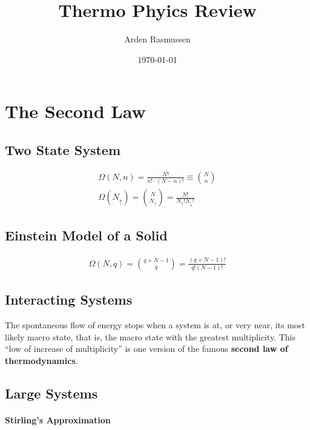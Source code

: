\documentclass[10pt]{article}
\title{Thermo Phyics Review}
\author{Arden Rasmussen}
\date{\today}
\begin{document}
\maketitle
\newpage
\tableofcontents
\newpage
{}

\section{The Second Law}%
\label{sec:the_second_law}

\subsection{Two State System}%
\label{sub:two_state_system}

\begin{align}
  \Omega(N,n) = \frac{N!}{n!\cdot(N-n)!}\equiv{N \choose n}\\
  \Omega\left(N_{\uparrow}\right)={N\choose
  N_{\uparrow}}=\frac{N!}{N_\uparrow!N_\downarrow!}
\end{align}

\subsection{Einstein Model of a Solid}%
\label{sub:einstein_model_of_a_solid}

\begin{align}
  \Omega(N,q)={q+N-1 \choose q} = \frac{(q+N-1)!}{q!(N-1)!}
\end{align}

\subsection{Interacting Systems}%
\label{sub:interacting_systems}

The spontaneous flow of energy stops when a system is at, or very near, its
most likely macro state, that is, the macro state with the greatest multiplicity.
This ``low of increase of multiplicity'' is one version of the famous
\textbf{second law of thermodynamics}.

\subsection{Large Systems}%
\label{sub:large_systems}

\paragraph{Stirling's Approximation}%
\label{par:stirling_s_approximation}
\end{document}
